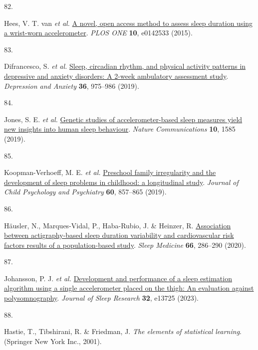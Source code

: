 \documentclass[
  10pt,
]{scrbook}
\newlength{\cslhangindent}
\newlength{\csllabelwidth}
\newlength{\cslentryspacingunit} %
\newenvironment{CSLReferences}[2] %
 {%
  \setlength{\parindent}{0pt}
  \ifodd #1
  \let\oldpar\par
  \def\par{\hangindent=\cslhangindent\oldpar}
  \fi
  \setlength{\parskip}{#2\cslentryspacingunit}
 }%
 {}
\newcommand{\CSLLeftMargin}[1]{\parbox[t]{\csllabelwidth}{#1}}
\newcommand{\CSLRightInline}[1]{\parbox[t]{\linewidth - \csllabelwidth}{#1}\break}
\let\originaltextbf\textbf
\renewcommand{\textbf}[1]{\textcolor{color1}{\textsf{\originaltextbf{#1}}}}
\begin{document}
\begin{CSLReferences}{0}{0}
\leavevmode{}%
\CSLLeftMargin{82. }%
\CSLRightInline{Hees, V. T. van \emph{et al.}
\href{https://doi.org/10.1371/journal.pone.0142533}{A novel, open access
method to assess sleep duration using a wrist-worn accelerometer}.
\emph{{PLOS} {ONE}} \textbf{10}, e0142533 (2015).}

\leavevmode{}%
\CSLLeftMargin{83. }%
\CSLRightInline{Difrancesco, S. \emph{et al.}
\href{https://doi.org/10.1002/da.22949}{Sleep, circadian rhythm, and
physical activity patterns in depressive and anxiety disorders: A 2-week
ambulatory assessment study}. \emph{Depression and Anxiety} \textbf{36},
975--986 (2019).}

\leavevmode{}%
\CSLLeftMargin{84. }%
\CSLRightInline{Jones, S. E. \emph{et al.}
\href{https://doi.org/10.1038/s41467-019-09576-1}{Genetic studies of
accelerometer-based sleep measures yield new insights into human sleep
behaviour}. \emph{Nature Communications} \textbf{10}, 1585 (2019).}

\leavevmode{}%
\CSLLeftMargin{85. }%
\CSLRightInline{Koopman-Verhoeff, M. E. \emph{et al.}
\href{https://doi.org/10.1111/jcpp.13060}{Preschool family irregularity
and the development of sleep problems in childhood: a longitudinal
study}. \emph{Journal of Child Psychology and Psychiatry} \textbf{60},
857--865 (2019).}

\leavevmode{}%
\CSLLeftMargin{86. }%
\CSLRightInline{Häusler, N., Marques-Vidal, P., Haba-Rubio, J. \&
Heinzer, R.
\href{https://doi.org/10.1016/j.sleep.2019.02.008}{Association between
actigraphy-based sleep duration variability and cardiovascular risk
factors {\textendash} results of a population-based study}. \emph{Sleep
Medicine} \textbf{66}, 286--290 (2020).}

\leavevmode{}%
\CSLLeftMargin{87. }%
\CSLRightInline{Johansson, P. J. \emph{et al.}
\href{https://doi.org/10.1111/jsr.13725}{Development and performance of
a sleep estimation algorithm using a single accelerometer placed on the
thigh: An evaluation against polysomnography}. \emph{Journal of Sleep
Research} \textbf{32}, e13725 (2023).}

\leavevmode{}%
\CSLLeftMargin{88. }%
\CSLRightInline{Hastie, T., Tibshirani, R. \& Friedman, J. \emph{The
elements of statistical learning}. (Springer New York Inc., 2001).}


\end{CSLReferences}
\end{document}
